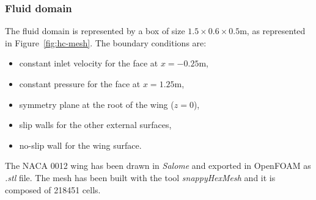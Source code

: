 \subsubsection{Fluid domain}

The fluid domain is represented by a box of size $1.5\times 0.6\times 0.5$\si{m}, as represented in Figure~\ref{fig:hc-mesh}. The boundary conditions are:

\begin{itemize}
    \item constant inlet velocity for the face at $x=-0.25$\si{m},
    \item constant pressure for the face at $x=1.25$\si{m},
    \item symmetry plane at the root of the wing ($z=0$),
    \item slip walls for the other external surfaces,
    \item no-slip wall for the wing surface.
\end{itemize}

The NACA 0012 wing has been drawn in \textit{Salome} and exported in OpenFOAM as \textit{.stl} file. The mesh has been built with the tool \textit{snappyHexMesh} and it is composed of 218451 cells. 



